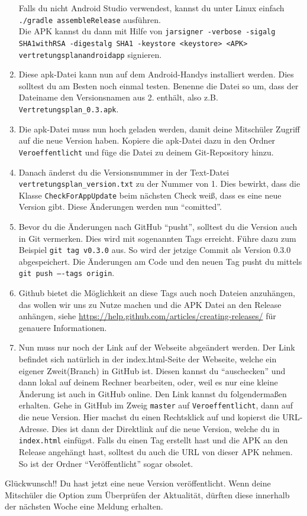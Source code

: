 \documentclass[12pt,headsepline]{scrartcl}
\begin{document}
\begin{enumerate}
Falls du nicht Android Studio verwendest, kannst du unter Linux einfach \texttt{./gradle assembleRelease} ausführen. \\
Die APK kannst du dann mit Hilfe von \texttt{jarsigner -verbose -sigalg SHA1withRSA -digestalg SHA1 -keystore <keystore> <APK> vertretungsplanandroidapp} signieren.
\item Diese apk-Datei kann nun auf dem Android-Handys installiert werden. Dies solltest du am Besten noch einmal testen. Benenne die Datei so um, dass der Dateiname den Versionsnamen aus 2. enthält, also z.B. \texttt{Vertretungsplan\_0.3.apk}.
\item Die apk-Datei muss nun hoch geladen werden, damit deine Mitschüler Zugriff auf die neue Version haben.
Kopiere die apk-Datei dazu in den Ordner \texttt{Veroeffentlicht} und füge die Datei zu deinem Git-Repository hinzu.
\item Danach änderst du die Versionsnummer in der Text-Datei \texttt{vertretungsplan\_version.txt} zu der Nummer von 1.
Dies bewirkt, dass die Klasse \texttt{CheckForAppUpdate} beim nächsten Check weiß, dass es eine neue Version gibt.
Diese Änderungen werden nun ``comitted''.
\item Bevor du die Änderungen nach GitHub ``pusht'', solltest du die Version auch in Git vermerken.
Dies wird mit sogenannten Tags erreicht.
Führe dazu zum Beispiel \texttt{git tag v0.3.0} aus.
So wird der jetzige Commit als Version 0.3.0 abgespeichert.
Die Änderungen am Code und den neuen Tag pusht du mittels \texttt{git push ----tags origin}.
\item Github bietet die Möglichkeit an diese Tags auch noch Dateien anzuhängen, das wollen wir uns zu Nutze machen und die APK Datei an den Release anhängen, siehe \url{https://help.github.com/articles/creating-releases/} für genauere Informationen.
\item Nun muss nur noch der Link auf der Webseite abgeändert werden. Der Link befindet sich natürlich in der index.html-Seite der Webseite, welche ein eigener Zweit(Branch) in GitHub ist.
Diesen kannst du ``auschecken'' und dann lokal auf deinem Rechner bearbeiten, oder, weil es nur eine kleine Änderung ist auch in GitHub online.
Den Link kannst du folgendermaßen erhalten.
Gehe in GitHub im Zweig \texttt{master} auf \texttt{Veroeffentlicht}, dann auf die neue Version.
Hier machst du einen Rechtsklick auf  und kopierst die URL-Adresse.
Dies ist dann der Direktlink auf die neue Version, welche du in \texttt{index.html} einfügst.
Falls du einen Tag erstellt hast und die APK an den Release angehängt hast, solltest du auch die URL von dieser APK nehmen.
So ist der Ordner ``Veröffentlicht'' sogar obsolet.
 \end{enumerate}
Glückwunsch!! Du hast jetzt eine neue Version veröffentlicht. Wenn deine Mitschüler die Option zum Überprüfen der Aktualität, dürften diese innerhalb der nächsten Woche eine Meldung erhalten.
 
\end{document}
